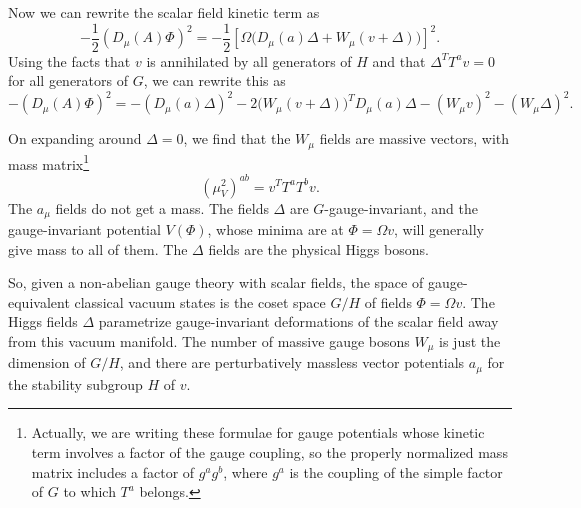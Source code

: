 Now we can rewrite the scalar field kinetic term as
\begin{equation*}
  -\frac12(D_\mu(A)\Phi)^2
  =-\frac12\left[\Omega\bigl(D_\mu(a)\Delta
  +W_\mu(v+\Delta)\bigr)\right]^2.
\end{equation*}
Using the facts that $v$ is annihilated by all generators of $H$ and that
$\Delta^TT^av=0$ for all generators of $G$, we can rewrite this as
\begin{equation*}
  -(D_\mu(A)\Phi)^2=-(D_\mu(a)\Delta)^2
  -2\bigl(W_\mu(v+\Delta)\bigr)^TD_\mu(a)\Delta
  -(W_\mu v)^2-(W_\mu\Delta)^2.
\end{equation*}

On expanding around $\Delta=0$, we find that the $W_\mu$ fields are massive
vectors, with mass matrix\footnote[3]{Actually, we are writing these formulae for
gauge potentials whose kinetic term involves a factor of the gauge coupling, so
the properly normalized mass matrix includes a factor of $g^ag^b$, where $g^a$
is the coupling of the simple factor of $G$ to which $T^a$ belongs.}
\begin{equation*}
  (\mu_V^2)^{ab}=v^TT^aT^bv.
\end{equation*}
The $a_\mu$ fields do not get a mass. The fields $\Delta$ are $G$-gauge-invariant,
and the gauge-invariant potential $V(\Phi)$, whose minima are at $\Phi=\Omega v$,
will generally give mass to all of them. The $\Delta$ fields are the physical
Higgs bosons.

So, given a non-abelian gauge theory with scalar fields, the space of
gauge-equivalent classical vacuum states is the coset space $G/H$ of fields
$\Phi=\Omega v$. The Higgs fields $\Delta$ parametrize gauge-invariant
deformations of the scalar field away from this vacuum manifold. The number of
massive gauge bosons $W_\mu$ is just the dimension of $G/H$, and there are
perturbatively massless vector potentials $a_\mu$ for the stability subgroup
$H$ of $v$.
